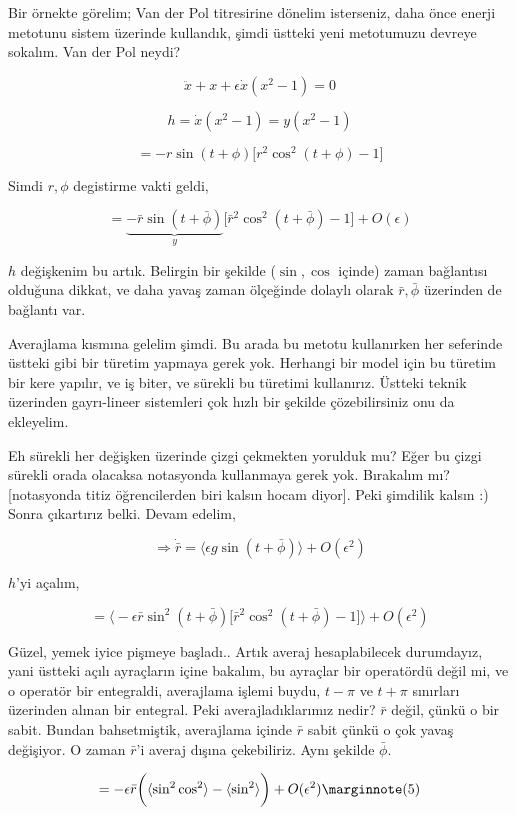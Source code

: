 \documentclass[12pt,fleqn]{article}\usepackage{../../common}
\begin{document}
Bir örnekte görelim; Van der Pol titresirine dönelim isterseniz, daha önce
enerji metotunu sistem üzerinde kullandık, şimdi üstteki yeni metotumuzu devreye
sokalım. Van der Pol neydi?

$$ \ddot{x} + x + \epsilon \dot{x}(x^2-1) = 0 $$

$$ h = \dot{x}(x^2-1)  = y(x^2-1) $$

$$ = -r \sin(t + \phi) \bigg[ r^2 \cos^2(t+\phi) - 1 \bigg]$$

Simdi $r,\phi$ degistirme vakti geldi,

$$
= \underbrace{-\bar{r} \sin(t + \bar{\phi})}_{y}
\bigg[ \bar{r}^2 \cos^2(t+\bar{\phi}) - 1 \bigg] + O(\epsilon)$$

$h$ değişkenim bu artık. Belirgin bir şekilde ($\sin,\cos$ içinde) zaman
bağlantısı olduğuna dikkat, ve daha yavaş zaman ölçeğinde dolaylı olarak
$\bar{r},\bar{\phi}$ üzerinden de bağlantı var.

Averajlama kısmına gelelim şimdi. Bu arada bu metotu kullanırken her seferinde
üstteki gibi bir türetim yapmaya gerek yok. Herhangi bir model için bu türetim
bir kere yapılır, ve iş biter, ve sürekli bu türetimi kullanırız. Üstteki teknik
üzerinden gayrı-lineer sistemleri çok hızlı bir şekilde çözebilirsiniz onu da
ekleyelim.

Eh sürekli her değişken üzerinde çizgi çekmekten yorulduk mu? Eğer bu çizgi
sürekli orada olacaksa notasyonda kullanmaya gerek yok. Bırakalım mı?
[notasyonda titiz öğrencilerden biri kalsın hocam diyor]. Peki şimdilik kalsın
:) Sonra çıkartırız belki. Devam edelim,

$$ \Rightarrow \dot{\bar{r}} =
\bigl\langle \epsilon g \sin (t+\bar{\phi}) \bigr\rangle + O(\epsilon^2)
$$

$h$'yi açalım,

$$
=
\biggl\langle -\epsilon \bar{r} \sin^2 (t+\bar{\phi})
\big[ \bar{r}^2 \cos^2 (t+\bar{\phi}) - 1\big]
\biggr\rangle + O(\epsilon^2)
$$

Güzel, yemek iyice pişmeye başladı.. Artık averaj hesaplabilecek durumdayız,
yani üstteki açılı ayraçların içine bakalım, bu ayraçlar bir operatördü değil
mi, ve o operatör bir entegraldi, averajlama işlemi buydu, $t-\pi$ ve $t+\pi$
sınırları üzerinden alınan bir entegral. Peki averajladıklarımız nedir?
$\bar{r}$ değil, çünkü o bir sabit. Bundan bahsetmiştik, averajlama içinde
$\bar{r}$ sabit çünkü o çok yavaş değişiyor. O zaman $\bar{r}$'i averaj dışına
çekebiliriz. Aynı şekilde $\bar{\phi}$.

$$ = -\epsilon \bar{r} \bigg(
\langle \sin^2\cos^2 \rangle - \langle \sin^2 \rangle 
\bigg) + O(\epsilon^2)
\mlabel{5}
$$
\end{document}
